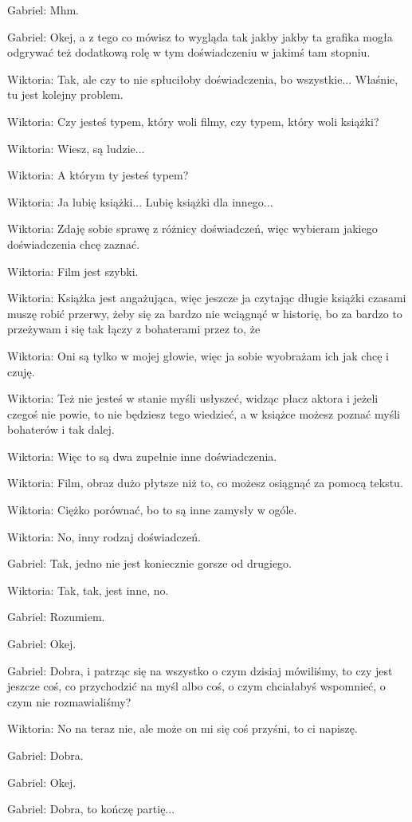 Gabriel: Mhm.

Gabriel: Okej, a z tego co mówisz to wygląda tak jakby jakby ta grafika mogła odgrywać też dodatkową rolę w tym doświadczeniu w jakimś tam stopniu.

Wiktoria: Tak, ale czy to nie spłuciłoby doświadczenia, bo wszystkie... Właśnie, tu jest kolejny problem.

Wiktoria: Czy jesteś typem, który woli filmy, czy typem, który woli książki?

Wiktoria: Wiesz, są ludzie...

Wiktoria: A którym ty jesteś typem?

Wiktoria: Ja lubię książki... Lubię książki dla innego...

Wiktoria: Zdaję sobie sprawę z różnicy doświadczeń, więc wybieram jakiego doświadczenia chcę zaznać.

Wiktoria: Film jest szybki.

Wiktoria: Książka jest angażująca, więc jeszcze ja czytając długie książki czasami muszę robić przerwy, żeby się za bardzo nie wciągnąć w historię, bo za bardzo to przeżywam i się tak łączy z bohaterami przez to, że

Wiktoria: Oni są tylko w mojej głowie, więc ja sobie wyobrażam ich jak chcę i czuję.

Wiktoria: Też nie jesteś w stanie myśli usłyszeć, widząc płacz aktora i jeżeli czegoś nie powie, to nie będziesz tego wiedzieć, a w książce możesz poznać myśli bohaterów i tak dalej.

Wiktoria: Więc to są dwa zupełnie inne doświadczenia.

Wiktoria: Film, obraz dużo płytsze niż to, co możesz osiągnąć za pomocą tekstu.

Wiktoria: Ciężko porównać, bo to są inne zamysły w ogóle.

Wiktoria: No, inny rodzaj doświadczeń.

Gabriel: Tak, jedno nie jest koniecznie gorsze od drugiego.

Wiktoria: Tak, tak, jest inne, no.

Gabriel: Rozumiem.

Gabriel: Okej.

Gabriel: Dobra, i patrząc się na wszystko o czym dzisiaj mówiliśmy, to czy jest jeszcze coś, co przychodzić na myśl albo coś, o czym chciałabyś wspomnieć, o czym nie rozmawialiśmy?

Wiktoria: No na teraz nie, ale może on mi się coś przyśni, to ci napiszę.

Gabriel: Dobra.

Gabriel: Okej.

Gabriel: Dobra, to kończę partię...

